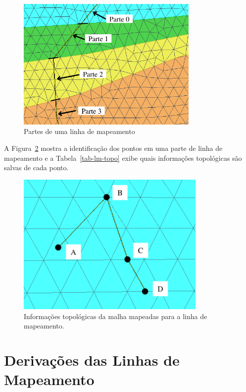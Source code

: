 \begin{figure} [h]
  \begin{center}
    \includegraphics[width=250pt]{images/fig-lm-parts}
    \caption{Partes de uma linha de mapeamento}\label{fig-linemap-parts}
  \end{center}
\end{figure}

A Figura~\ref{fig-lm-topo} mostra a identificação dos pontos em uma parte de linha de mapeamento e a Tabela~\ref{tab-lm-topo} exibe quais informações topológicas são salvas de cada ponto.

\begin{figure} [hbt!]
  \begin{center}
    \includegraphics[width=260pt]{images/fig-lm-topo}
    \caption{Informações topológicas da malha mapeadas para a linha de mapeamento.}\label{fig-lm-topo}
  \end{center}
\end{figure}



\section{Derivações das Linhas de Mapeamento}

